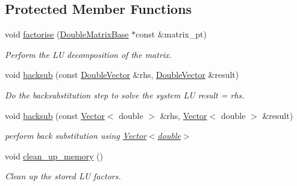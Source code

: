 \subsection*{Protected Member Functions}
\begin{DoxyCompactItemize}
\item 
void \hyperlink{classoomph_1_1DenseLU_a943a629a67289120473855bc96766dfc}{factorise} (\hyperlink{classoomph_1_1DoubleMatrixBase}{Double\+Matrix\+Base} $\ast$const \&matrix\+\_\+pt)
\begin{DoxyCompactList}\small\item\em Perform the LU decomposition of the matrix. \end{DoxyCompactList}\item 
void \hyperlink{classoomph_1_1DenseLU_a4fc7e7a29cb86df73883df9c6a65600b}{backsub} (const \hyperlink{classoomph_1_1DoubleVector}{Double\+Vector} \&rhs, \hyperlink{classoomph_1_1DoubleVector}{Double\+Vector} \&result)
\begin{DoxyCompactList}\small\item\em Do the backsubstitution step to solve the system LU result = rhs. \end{DoxyCompactList}\item 
void \hyperlink{classoomph_1_1DenseLU_acef3a68bf4e28465a7c316dba135f504}{backsub} (const \hyperlink{classoomph_1_1Vector}{Vector}$<$ double $>$ \&rhs, \hyperlink{classoomph_1_1Vector}{Vector}$<$ double $>$ \&result)
\begin{DoxyCompactList}\small\item\em perform back substitution using \hyperlink{classoomph_1_1Vector}{Vector$<$double$>$} \end{DoxyCompactList}\item 
void \hyperlink{classoomph_1_1DenseLU_a5d4d454874476adadb3bc23913b1190b}{clean\+\_\+up\+\_\+memory} ()
\begin{DoxyCompactList}\small\item\em Clean up the stored LU factors. \end{DoxyCompactList}\end{DoxyCompactItemize}
